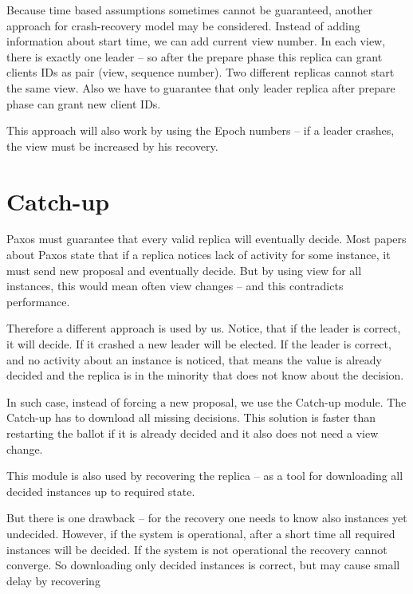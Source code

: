 Because time based assumptions sometimes cannot be guaranteed, another approach for crash-recovery model may be considered. Instead of adding information about start time, we can add current view number. In each view, there is exactly one leader -- so after the prepare phase this replica can grant clients IDs as pair (view, sequence number). Two different replicas cannot start the same view.
Also we have to guarantee that only leader replica after prepare phase can grant new client IDs.

This approach will also work by using the Epoch numbers -- if a leader crashes, the view must be increased by his recovery.


\section{Catch-up}
\label{sec:catch_up}


Paxos must guarantee that every valid replica will eventually decide. Most papers about Paxos state that if a replica notices lack of activity for some instance, it must send new proposal and eventually decide. But by using view for all instances, this would mean often view changes -- and this contradicts performance.

Therefore a different approach is used by us. Notice, that if the leader is correct, it will decide. If it crashed a new leader will be elected. If the leader is correct, and no activity about an instance is noticed, that means the value is already decided and the replica is in the minority that does not know about the decision.

In such case, instead of forcing a new proposal, we use the Catch-up module.
The Catch-up has to download all missing decisions. This solution is faster than restarting the ballot if it is already decided and it also does not need a view change.


This module is also used by recovering the replica -- as a tool for downloading all decided instances up to required state.

But there is one drawback -- for the recovery one needs to know also instances yet undecided.  However, if the system is operational, after a short time all required instances will be decided. If the system is not operational the recovery cannot converge. So downloading only decided instances is correct, but may cause small delay by recovering

